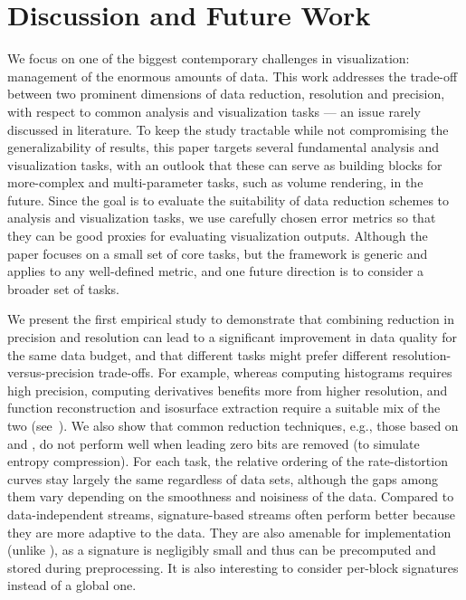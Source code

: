 \section{Discussion and Future Work}

We focus on one of the biggest contemporary challenges in visualization: management of 
the enormous amounts of data. This work addresses the trade-off between two prominent 
dimensions of data reduction, resolution and precision, with respect to 
common analysis and visualization tasks --- 
an issue rarely discussed in literature.
To keep the study tractable while not
compromising the generalizability of results, this paper targets 
several fundamental analysis and visualization tasks, with an outlook that these can serve as building blocks 
for more-complex and multi-parameter tasks, such as volume rendering, in the future.
Since the goal is to evaluate the suitability of data reduction schemes to analysis and 
visualization tasks, we use carefully chosen error metrics 
so that they can be good
proxies for evaluating visualization outputs. Although the paper focuses on a small set of core tasks, but
the framework is generic and applies to any well-defined metric, and one future direction is to
consider a broader set of tasks.

We present the first empirical study to demonstrate that combining reduction in precision and
resolution can lead to a significant improvement in data quality for the same data budget, and that
different tasks might prefer different resolution-versus-precision trade-offs. For example, whereas
computing histograms requires high precision, computing derivatives benefits more from higher
resolution, and function reconstruction and isosurface extraction require a suitable mix of the two
(see~). We also show that common reduction techniques, e.g., those based on
\slvl and \smag, do not perform well when leading zero bits are removed (to simulate entropy
compression). For each task, the relative ordering of the rate-distortion curves stay largely the
same regardless of data sets, although the gaps among them vary depending on the smoothness and
noisiness of the data. Compared to data-independent streams, signature-based streams often perform
better because they are more adaptive to the data. They are also amenable for implementation (unlike
\sopt), as a signature is negligibly small and thus can be precomputed and stored during
preprocessing. It is also interesting to consider per-block signatures instead of a global one.

